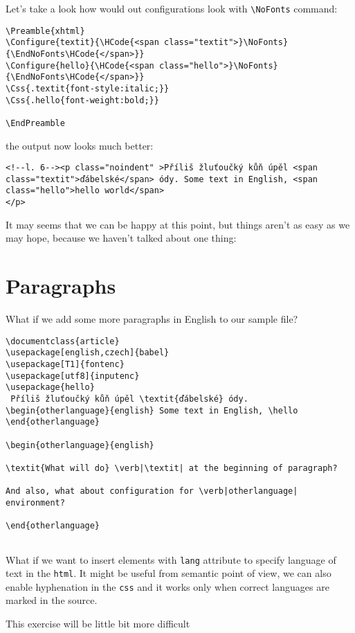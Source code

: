 Let's take a look how would out configurations look with
\texttt{\textbackslash{}NoFonts} command:

\begin{verbatim}
\Preamble{xhtml}
\Configure{textit}{\HCode{<span class="textit">}\NoFonts}
{\EndNoFonts\HCode{</span>}}
\Configure{hello}{\HCode{<span class="hello">}\NoFonts}
{\EndNoFonts\HCode{</span>}}
\Css{.textit{font-style:italic;}}
\Css{.hello{font-weight:bold;}}

\EndPreamble
\end{verbatim}

the output now looks much better:

\begin{verbatim}
<!--l. 6--><p class="noindent" >Příliš žluťoučký kůň úpěl <span class="textit">ďábelské</span> ódy. Some text in English, <span class="hello">hello world</span>
</p> 
\end{verbatim}

It may seems that we can be happy at this point, but things aren't as
easy as we may hope, because we haven't talked about one thing:

\hypertarget{paragraphs}{%
\section{Paragraphs}\label{paragraphs}}

What if we add some more paragraphs in English to our sample file?

\begin{verbatim}
\documentclass{article}
\usepackage[english,czech]{babel} 
\usepackage[T1]{fontenc}
\usepackage[utf8]{inputenc} 
\usepackage{hello}
 Příliš žluťoučký kůň úpěl \textit{ďábelské} ódy.
\begin{otherlanguage}{english} Some text in English, \hello
\end{otherlanguage} 

\begin{otherlanguage}{english} 

\textit{What will do} \verb|\textit| at the beginning of paragraph?

And also, what about configuration for \verb|otherlanguage| environment?

\end{otherlanguage}


\end{verbatim}

What if we want to insert elements with \texttt{lang} attribute to
specify language of text in the \texttt{html}. It might be useful from
semantic point of view, we can also enable hyphenation in the
\texttt{css} and it works only when correct languages are marked in the
source.

This exercise will be little bit more difficult
